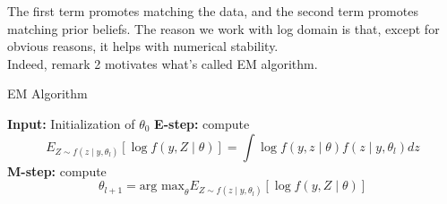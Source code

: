 \documentclass{article}
\theoremstyle{remark}
\begin{document}
The first term promotes matching the data, and the second term promotes matching prior beliefs.
The reason we work with log domain is that, except for obvious reasons, it helps with numerical stability.
\\
Indeed, remark 2 motivates what's called EM algorithm.
\begin{algorithm}
    \caption{EM Algorithm}
    \begin{algorithmic}[1] %
    \State \textbf{Input:} Initialization of $\theta_0$
    \Repeat
        \State \textbf{E-step:} compute 
        \[
        E_{Z\sim f(z\mid y,\theta_l)}[\log f(y,Z\mid \theta)] = \int \log f(y,z\mid \theta)f(z\mid y,\theta_l)dz
        \]
        \State \textbf{M-step:} compute
        \[
        \theta_{l+1} = \text{arg max}_\theta E_{Z\sim f(z\mid y,\theta_l)}[\log f(y,Z\mid \theta)]
        \]
    \end{algorithmic}
\end{algorithm}
\end{document}
